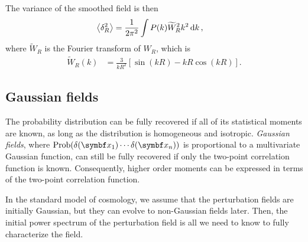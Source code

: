 The variance of the smoothed field is then
\begin{align*}
	\left\langle \delta_R^2 \right\rangle
	&= \frac{1}{2 \pi^2} \int P(k) \widetilde{W}_R^2 k^2 \dd{k},
\end{align*}
where $\widetilde{W}_R$ is the Fourier transform of $W_R$, which is
\begin{align*}
	\widetilde{W}_R(k)
	&= \frac{3}{k R^2} [\sin(kR) - kR \cos(kR)].
\end{align*}

\subsection{Gaussian fields}

The probability distribution can be fully recovered if all of its statistical moments are known, as long as the distribution is homogeneous and isotropic. \emph{Gaussian fields}, where $\Prob(\delta(\vec{x}_1) \cdots \delta(\vec{x}_n))$ is proportional to a multivariate Gaussian function, can still be fully recovered if only the two-point correlation function is known. Consequently, higher order moments can be expressed in terms of the two-point correlation function.

In the standard model of cosmology, we assume that the perturbation fields are initially Gaussian, but they can evolve to non-Gaussian fields later. Then, the initial power spectrum of the perturbation field is all we need to know to fully characterize the field.




